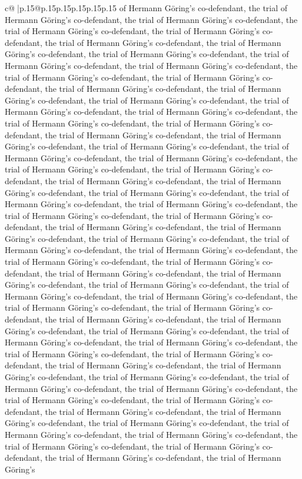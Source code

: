 \documentclass{article}
\begin{document}
{\begin{supertabular}{c@{$\;$}|p{.15\linewidth}@{}p{.15\linewidth}p{.15\linewidth}p{.15\linewidth}p{.15\linewidth}p{.15\linewidth}}
{{{of Hermann Göring's co{-}defendant, the trial of Hermann Göring's co{-}defendant, the trial of Hermann Göring's co{-}defendant, the trial of Hermann Göring's co{-}defendant, the trial of Hermann Göring's co{-}defendant, the trial of Hermann Göring's co{-}defendant, the trial of Hermann Göring's co{-}defendant, the trial of Hermann Göring's co{-}defendant, the trial of Hermann Göring's co{-}defendant, the trial of Hermann Göring's co{-}defendant, the trial of Hermann Göring's co{-}defendant, the trial of Hermann Göring's co{-}defendant, the trial of Hermann Göring's co{-}defendant, the trial of Hermann Göring's co{-}defendant, the trial of Hermann Göring's co{-}defendant, the trial of Hermann Göring's co{-}defendant, the trial of Hermann Göring's co{-}defendant, the trial of Hermann Göring's co{-}defendant, the trial of Hermann Göring's co{-}defendant, the trial of Hermann Göring's co{-}defendant, the trial of Hermann Göring's co{-}defendant, the trial of Hermann Göring's co{-}defendant, the trial of Hermann Göring's co{-}defendant, the trial of Hermann Göring's co{-}defendant, the trial of Hermann Göring's co{-}defendant, the trial of Hermann Göring's co{-}defendant, the trial of Hermann Göring's co{-}defendant, the trial of Hermann Göring's co{-}defendant, the trial of Hermann Göring's co{-}defendant, the trial of Hermann Göring's co{-}defendant, the trial of Hermann Göring's co{-}defendant, the trial of Hermann Göring's co{-}defendant, the trial of Hermann Göring's co{-}defendant, the trial of Hermann Göring's co{-}defendant, the trial of Hermann Göring's co{-}defendant, the trial of Hermann Göring's co{-}defendant, the trial of Hermann Göring's co{-}defendant, the trial of Hermann Göring's co{-}defendant, the trial of Hermann Göring's co{-}defendant, the trial of Hermann Göring's co{-}defendant, the trial of Hermann Göring's co{-}defendant, the trial of Hermann Göring's co{-}defendant, the trial of Hermann Göring's co{-}defendant, the trial of Hermann Göring's co{-}defendant, the trial of Hermann Göring's co{-}defendant, the trial of Hermann Göring's co{-}defendant, the trial of Hermann Göring's co{-}defendant, the trial of Hermann Göring's co{-}defendant, the trial of Hermann Göring's co{-}defendant, the trial of Hermann Göring's co{-}defendant, the trial of Hermann Göring's co{-}defendant, the trial of Hermann Göring's co{-}defendant, the trial of Hermann Göring's co{-}defendant, the trial of Hermann Göring's co{-}defendant, the trial of Hermann Göring's co{-}defendant, the trial of Hermann Göring's co{-}defendant, the trial of Hermann Göring's co{-}defendant, the trial of Hermann Göring's co{-}defendant, the trial of Hermann Göring's co{-}defendant, the trial of Hermann Göring's co{-}defendant, the trial of Hermann Göring's co{-}defendant, the trial of Hermann Göring's co{-}defendant, the trial of Hermann Göring's co{-}defendant, the trial of Hermann Göring's co{-}defendant, the trial of Hermann Göring's co{-}defendant, the trial of Hermann Göring's co{-}defendant, the trial of Hermann Göring's co{-}defendant, the trial of Hermann Göring's co{-}defendant, the trial of Hermann Göring's co{-}defendant, the trial of Hermann Göring's }}}
\end{supertabular}}
\end{document}
